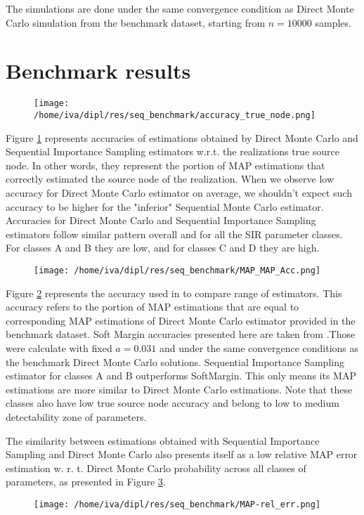 \documentclass[times, utf8, diplomski]{fer}
\begin{document}
The simulations are done under the same convergence condition as Direct Monte Carlo simulation from the benchmark dataset, starting from $n = 10000$ samples.

\section{Benchmark results}
\begin{figure}[H]
\texttt{[image: /home/iva/dipl/res/seq\_benchmark/accuracy\_true\_node.png]}
\caption{}
\label{accuracy_true}
\end{figure}
Figure \ref{accuracy_true} represents accuracies of estimations obtained by Direct Monte Carlo and Sequential Importance Sampling estimators w.r.t. the realizations true source node. In other words, they represent the portion of MAP estimations that correctly estimated the source node of the realization. When we observe low accuracy for Direct Monte Carlo estimator on average, we shouldn't expect such accuracy to be higher for the "inferior" Sequential Monte Carlo estimator. Accuracies for Direct Monte Carlo and Sequential Importance Sampling estimators follow similar pattern overall and for all the SIR parameter classes. For classes A and B they are low, and for classes C and D they are high. 

\begin{figure}[H]
\texttt{[image: /home/iva/dipl/res/seq\_benchmark/MAP\_MAP\_Acc.png]}
\caption{}
\label{map_map_acc}
\end{figure}
Figure \ref{map_map_acc} represents the accuracy used in \cite{Nino} to compare range of estimators. This accuracy refers to the portion of MAP estimations that are equal to corresponding MAP estimations of Direct Monte Carlo estimator provided in the benchmark dataset. Soft Margin accuracies presented here are taken from \cite{Nino}.Those were calculate with fixed $a=0.031$ and under the same convergence conditions as the benchmark Direct Monte Carlo solutions. Sequential Importance Sampling estimator for classes A and B outperforms SoftMargin. This only means its MAP estimations are  more similar to Direct Monte Carlo estimations. Note that these classes also have low true source node accuracy and belong to low  to medium detectability zone of parameters.

The similarity between estimations obtained with Sequential Importance Sampling and Direct Monte Carlo also presents itself as a low relative MAP error estimation w. r. t. Direct Monte Carlo probability across all classes of parameters, as presented in Figure \ref{rel_err}.
\begin{figure}[H]
\texttt{[image: /home/iva/dipl/res/seq\_benchmark/MAP-rel\_err.png]}
\caption{}
\label{rel_err}
\end{figure}
\end{document}
